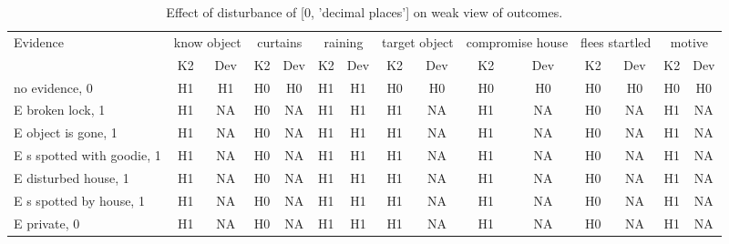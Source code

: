 \begin{table}\begin{tabular}{l|cc|cc|cc|cc|cc|cc|cc}\toprule\multirow{2}{*}{Evidence} & \multicolumn{2}{c}{know object}& \multicolumn{2}{c}{curtains}& \multicolumn{2}{c}{raining}& \multicolumn{2}{c}{target object}& \multicolumn{2}{c}{compromise house}& \multicolumn{2}{c}{flees startled}& \multicolumn{2}{c}{motive}\\& {K2} & {Dev}& {K2} & {Dev}& {K2} & {Dev}& {K2} & {Dev}& {K2} & {Dev}& {K2} & {Dev}& {K2} & {Dev}\\\midrule
no evidence, 0 & H1&H1&H0&H0&H1&H1&H0&H0&H0&H0&H0&H0&H0&H0\\E broken lock, 1 & \cellcolor{Bittersweet}H1&\cellcolor{Bittersweet}NA&\cellcolor{Bittersweet}H0&\cellcolor{Bittersweet}NA&H1&H1&\cellcolor{Bittersweet}H1&\cellcolor{Bittersweet}NA&\cellcolor{Bittersweet}H1&\cellcolor{Bittersweet}NA&\cellcolor{Bittersweet}H0&\cellcolor{Bittersweet}NA&\cellcolor{Bittersweet}H1&\cellcolor{Bittersweet}NA\\E object is gone, 1 & \cellcolor{Bittersweet}H1&\cellcolor{Bittersweet}NA&\cellcolor{Bittersweet}H0&\cellcolor{Bittersweet}NA&H1&H1&\cellcolor{Bittersweet}H1&\cellcolor{Bittersweet}NA&\cellcolor{Bittersweet}H1&\cellcolor{Bittersweet}NA&\cellcolor{Bittersweet}H0&\cellcolor{Bittersweet}NA&\cellcolor{Bittersweet}H1&\cellcolor{Bittersweet}NA\\E s spotted with goodie, 1 & \cellcolor{Bittersweet}H1&\cellcolor{Bittersweet}NA&\cellcolor{Bittersweet}H0&\cellcolor{Bittersweet}NA&H1&H1&\cellcolor{Bittersweet}H1&\cellcolor{Bittersweet}NA&\cellcolor{Bittersweet}H1&\cellcolor{Bittersweet}NA&\cellcolor{Bittersweet}H0&\cellcolor{Bittersweet}NA&\cellcolor{Bittersweet}H1&\cellcolor{Bittersweet}NA\\E disturbed house, 1 & \cellcolor{Bittersweet}H1&\cellcolor{Bittersweet}NA&\cellcolor{Bittersweet}H0&\cellcolor{Bittersweet}NA&H1&H1&\cellcolor{Bittersweet}H1&\cellcolor{Bittersweet}NA&\cellcolor{Bittersweet}H1&\cellcolor{Bittersweet}NA&\cellcolor{Bittersweet}H0&\cellcolor{Bittersweet}NA&\cellcolor{Bittersweet}H1&\cellcolor{Bittersweet}NA\\E s spotted by house, 1 & \cellcolor{Bittersweet}H1&\cellcolor{Bittersweet}NA&\cellcolor{Bittersweet}H0&\cellcolor{Bittersweet}NA&H1&H1&\cellcolor{Bittersweet}H1&\cellcolor{Bittersweet}NA&\cellcolor{Bittersweet}H1&\cellcolor{Bittersweet}NA&\cellcolor{Bittersweet}H0&\cellcolor{Bittersweet}NA&\cellcolor{Bittersweet}H1&\cellcolor{Bittersweet}NA\\E private, 0 & \cellcolor{Bittersweet}H1&\cellcolor{Bittersweet}NA&\cellcolor{Bittersweet}H0&\cellcolor{Bittersweet}NA&H1&H1&\cellcolor{Bittersweet}H1&\cellcolor{Bittersweet}NA&\cellcolor{Bittersweet}H1&\cellcolor{Bittersweet}NA&\cellcolor{Bittersweet}H0&\cellcolor{Bittersweet}NA&\cellcolor{Bittersweet}H1&\cellcolor{Bittersweet}NA\\\bottomrule\end{tabular}\caption{Effect of disturbance of [0, 'decimal places'] on weak view of outcomes.}\end{table}